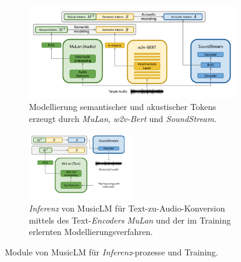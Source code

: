 \documentclass[
  a4paper,  %
  twoside,  %
  bibliography=totoc,
  headsepline,
  cleardoublepage=empty,
  parskip=half,
  draft=false
]{scrbook}
\begin{document}
\begin{figure}[h]
\centering
\begin{subfigure}{.8\textwidth}
  \centering
  \includegraphics[width=1\textwidth]{graphics/MusicLM1.png}
  \caption[MusicLM Tokenisierung]{Modellierung semantischer und akustischer Tokens erzeugt durch \emph{MuLan}, \emph{w2v-Bert} und \emph{SoundStream}. \cite{agostinelli_musiclm_2023}}
  \label{fig:MusicLM_tokens}
\end{subfigure}

\vspace{1em} %

\begin{subfigure}{1.0\textwidth}
  \centering
  \includegraphics[width=0.5\textwidth]{graphics/MusicLM2.png}
  \caption[MusicLM Inferenz]{\emph{Inferenz} von MusicLM für Text-zu-Audio-Konversion mittels des Text-\emph{Encoders} \emph{MuLan} und der im Training erlernten Modellierungsverfahren. \cite{agostinelli_musiclm_2023}}
  \label{fig:MusicLM_Inference}
\end{subfigure}
\caption[MusicLM Module]{Module von MusicLM für \emph{Inferenz}-prozesse und Training. \cite{agostinelli_musiclm_2023}}
\label{fig:test}
\end{figure}
\end{document}
